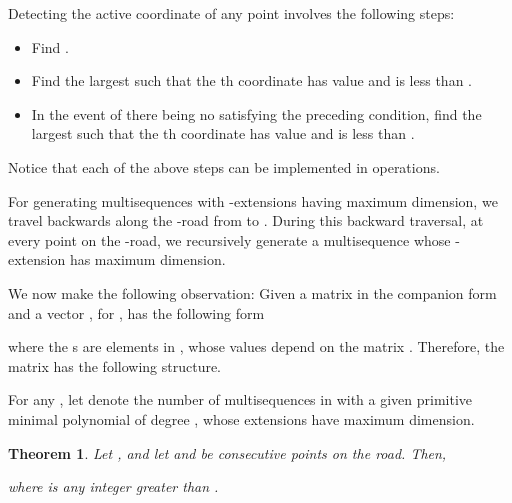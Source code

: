 \documentclass[letterpaper, 12 pt]{article}  \usepackage{amssymb}
\newtheorem{theorem}{Theorem}[section]
\begin{document}
Detecting the active
coordinate of any point  involves the following steps:
\begin{itemize}
 \item Find .
 \item Find the largest  such that the th coordinate has value
 and is less than .
 \item In the event of there being no  satisfying the preceding condition, find
the largest  such that
the th coordinate has value  and is less than .
\end{itemize}

Notice that each of the above steps can be implemented in  operations. 





For generating multisequences with -extensions having maximum dimension, 
we travel backwards along the -road from  to . During this
backward 
traversal, at every point  on the -road, we recursively generate a 
multisequence whose -extension has maximum dimension.



We now make the following observation: Given a matrix  in the companion form and a vector
, for ,  has the
following form

 where the s are elements in , whose values depend on the matrix .
Therefore, the matrix  has the following
structure.
    

For any , let  denote the number of multisequences
in  with a given primitive minimal polynomial of degree , whose extensions have maximum dimension.
\begin{theorem}
\label{starLemma}
Let , and let  and 
be consecutive points on the road. Then,  

where  is any integer greater than .
\end{theorem}
\end{document}
